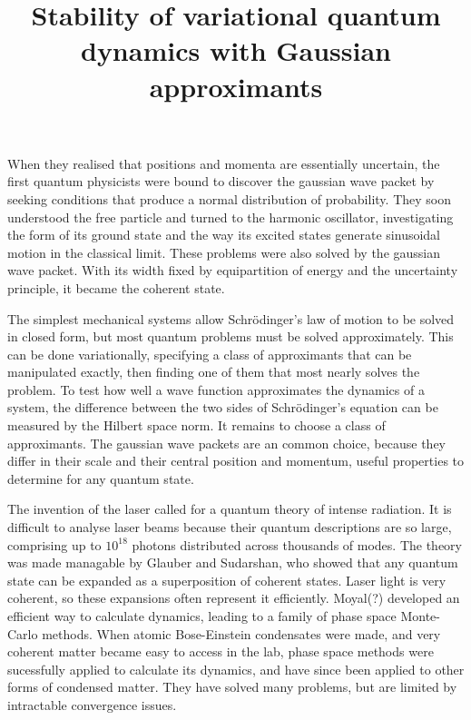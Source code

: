 \nonstopmode




\title{Stability of variational quantum dynamics with Gaussian approximants}

\def\G{|Γ〉}
\def\Gx{|Γ_χ〉}
\def\cite#1{$[\hbox{\tt #1}]$}


When they realised that positions and momenta are essentially uncertain, the first quantum physicists were bound to discover the gaussian wave packet by seeking conditions that produce a normal distribution of probability.  They soon understood the free particle and turned to the harmonic oscillator, investigating the form of its ground state and the way its excited states generate sinusoidal motion in the classical limit.  These problems were also solved by the gaussian wave packet.  With its width fixed by equipartition of energy and the uncertainty principle, it became the coherent state.

The simplest mechanical systems allow Schrödinger's law of motion to be solved in closed form, but most quantum problems must be solved approximately.  This can be done variationally, specifying a class of approximants that can be manipulated exactly, then finding one of them that most nearly solves the problem.  To test how well a wave function approximates the dynamics of a system, the difference between the two sides of Schrödinger's equation can be measured by the Hilbert space norm.  It remains to choose a class of approximants.  The gaussian wave packets are an common choice, because they differ in their scale and their central position and momentum, useful properties to determine for any quantum state.

The invention of the laser called for a quantum theory of intense radiation.  It is difficult to analyse laser beams because their quantum descriptions are so large, comprising up to $10^{18}$ photons distributed across thousands of modes.  The theory was made managable by Glauber and Sudarshan, who showed that any quantum state can be expanded as a superposition of coherent states.  Laser light is very coherent, so these expansions often represent it efficiently.  Moyal(?) developed an efficient way to calculate dynamics, leading to a family of phase space Monte-Carlo methods.  When atomic Bose-Einstein condensates were made, and very coherent matter became easy to access in the lab, phase space methods were sucessfully applied to calculate its dynamics, and have since been applied to other forms of condensed matter.  They have solved many problems, but are limited by intractable convergence issues.

